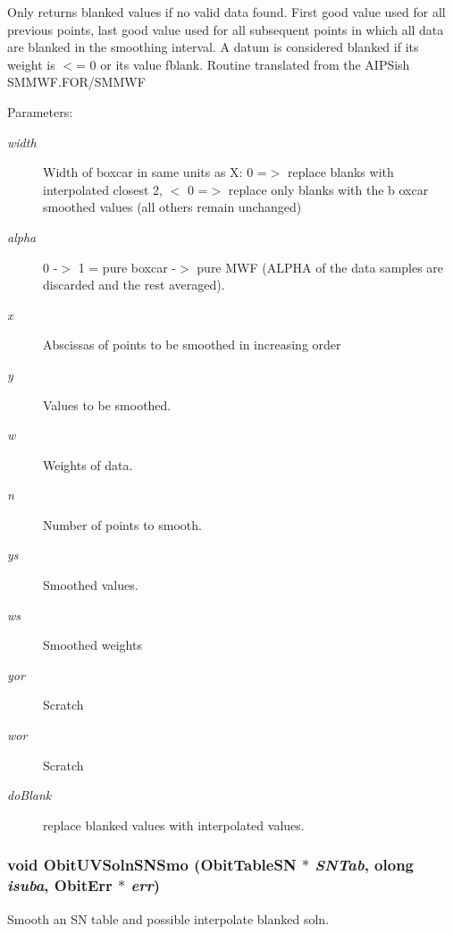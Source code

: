 Only returns blanked values if no valid data found. First good value used for all previous points, last good value used for all subsequent points in which all data are blanked in the smoothing interval. A datum is considered blanked if its weight is $<$= 0 or its value fblank. Routine translated from the AIPSish SMMWF.FOR/SMMWF \begin{Desc}
\item[Parameters:]
\begin{description}
\item[{\em width}]Width of boxcar in same units as X: 0 =$>$ replace blanks with interpolated closest 2, $<$ 0 =$>$ replace only blanks with the b oxcar smoothed values (all others remain unchanged) \item[{\em alpha}]0 -$>$ 1 = pure boxcar -$>$ pure MWF (ALPHA of the data samples are discarded and the rest averaged). \item[{\em x}]Abscissas of points to be smoothed in increasing order \item[{\em y}]Values to be smoothed. \item[{\em w}]Weights of data. \item[{\em n}]Number of points to smooth. \item[{\em ys}]Smoothed values. \item[{\em ws}]Smoothed weights \item[{\em yor}]Scratch \item[{\em wor}]Scratch \item[{\em do\-Blank}]replace blanked values with interpolated values. \end{description}
\end{Desc}
\subsubsection{\setlength{\rightskip}{0pt plus 5cm}void Obit\-UVSoln\-SNSmo ({\bf Obit\-Table\-SN} $\ast$ {\em SNTab}, {\bf olong} {\em isuba}, {\bf Obit\-Err} $\ast$ {\em err})}\label{ObitUVSoln_8c_a28}


Smooth an SN table and possible interpolate blanked soln. 

